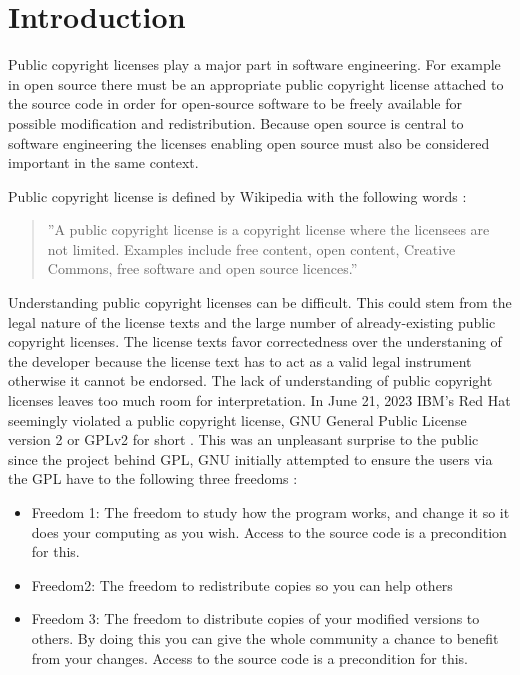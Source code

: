 \chapter{Introduction\label{intro}}

Public copyright licenses play a major part in software engineering. For example in open source there must be an appropriate public copyright license attached to the source code in order for open-source software to be freely available for possible modification and redistribution. Because open source is central to software engineering the licenses enabling open source must also be considered important in the same context.

Public copyright license is defined by Wikipedia with the following words \citep{wiki:publiclicenses}:
\begin{quote}
	''A public copyright license is a copyright license where the licensees are not limited. Examples include free content, open content, Creative Commons, free software and open source licences.''
\end{quote}

Understanding public copyright licenses can be difficult. This could stem from the legal nature of the license texts and the large number of already-existing public copyright licenses. The license texts favor correctedness over the understaning of the developer because the license text has to act as a valid legal instrument otherwise it cannot be endorsed. The lack of understanding of public copyright licenses leaves too much room for interpretation. In June 21, 2023 IBM's Red Hat seemingly violated a public copyright license, GNU General Public License version 2 or GPLv2 for short \citep{sfc:rhel} \citep{ibm:rhel}. This was an unpleasant surprise to the public since the project behind GPL, GNU initially attempted to ensure the users via the GPL have to the following three freedoms \citep{gnu:free}:
\begin{itemize}
	\item Freedom 1:	The freedom to study how the program works, and change it so it does your computing as you wish. Access to the source code is a precondition for this.
	\item Freedom2: The freedom to redistribute copies so you can help others
	\item Freedom 3:	The freedom to distribute copies of your modified versions to others. By doing this you can give the whole community a chance to benefit from your changes. Access to the source code is a precondition for this.
\end{itemize}

